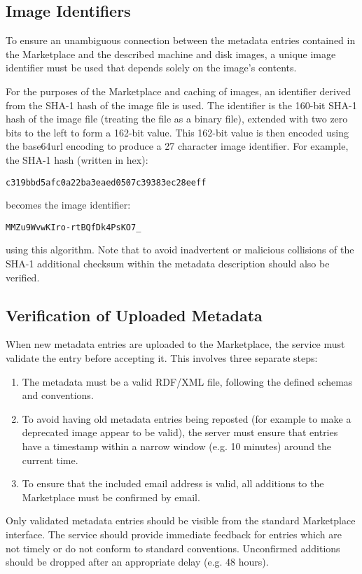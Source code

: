 \subsection{Image Identifiers}

To ensure an unambiguous connection between the metadata entries
contained in the Marketplace and the described machine and disk
images, a unique image identifier must be used that depends solely on
the image's contents.

For the purposes of the Marketplace and caching of images, an
identifier derived from the SHA-1 hash of the image file is used.  The
identifier is the 160-bit SHA-1 hash of the image file (treating the
file as a binary file), extended with two zero bits to the left to
form a 162-bit value.  This 162-bit value is then encoded using the
base64url encoding to produce a 27 character image identifier.  For
example, the SHA-1 hash (written in hex):
\begin{verbatim}
c319bbd5afc0a22ba3eaed0507c39383ec28eeff
\end{verbatim}
becomes the image identifier:
\begin{verbatim}
MMZu9WvwKIro-rtBQfDk4PsKO7_
\end{verbatim}
using this algorithm.  Note that to avoid inadvertent or malicious
collisions of the SHA-1 additional checksum within the metadata
description should also be verified.

\subsection{Verification of Uploaded Metadata}

When new metadata entries are uploaded to the Marketplace, the service
must validate the entry before accepting it.  This involves three
separate steps:
\begin{enumerate}
\item The metadata must be a valid RDF/XML file, following the defined
  schemas and conventions.
\item To avoid having old metadata entries being reposted (for example
  to make a deprecated image appear to be valid), the server must
  ensure that entries have a timestamp within a narrow window (e.g. 10
  minutes) around the current time.
\item To ensure that the included email address is valid, all
  additions to the Marketplace must be confirmed by email.
\end{enumerate}
Only validated metadata entries should be visible from the standard
Marketplace interface.  The service should provide immediate feedback
for entries which are not timely or do not conform to standard
conventions.  Unconfirmed additions should be dropped after an
appropriate delay (e.g. 48 hours).

